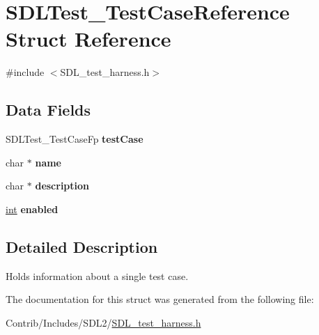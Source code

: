 \hypertarget{struct_s_d_l_test___test_case_reference}{}\section{S\+D\+L\+Test\+\_\+\+Test\+Case\+Reference Struct Reference}
\label{struct_s_d_l_test___test_case_reference}


{\ttfamily \#include $<$S\+D\+L\+\_\+test\+\_\+harness.\+h$>$}

\subsection*{Data Fields}
\begin{DoxyCompactItemize}
\item 
S\+D\+L\+Test\+\_\+\+Test\+Case\+Fp {\bfseries test\+Case}\hypertarget{struct_s_d_l_test___test_case_reference_a0576a913b1af0c2aa389358522ed2290}{}\label{struct_s_d_l_test___test_case_reference_a0576a913b1af0c2aa389358522ed2290}

\item 
char $\ast$ {\bfseries name}\hypertarget{struct_s_d_l_test___test_case_reference_a5ac083a645d964373f022d03df4849c8}{}\label{struct_s_d_l_test___test_case_reference_a5ac083a645d964373f022d03df4849c8}

\item 
char $\ast$ {\bfseries description}\hypertarget{struct_s_d_l_test___test_case_reference_a8444d6e0dfe2bbab0b5e7b24308f1559}{}\label{struct_s_d_l_test___test_case_reference_a8444d6e0dfe2bbab0b5e7b24308f1559}

\item 
\hyperlink{_s_d_l__thread_8h_a6a64f9be4433e4de6e2f2f548cf3c08e}{int} {\bfseries enabled}\hypertarget{struct_s_d_l_test___test_case_reference_a03e6cca0c879c0443efb431c30c14f76}{}\label{struct_s_d_l_test___test_case_reference_a03e6cca0c879c0443efb431c30c14f76}

\end{DoxyCompactItemize}


\subsection{Detailed Description}
Holds information about a single test case. 

The documentation for this struct was generated from the following file\+:\begin{DoxyCompactItemize}
\item 
Contrib/\+Includes/\+S\+D\+L2/\hyperlink{_s_d_l__test__harness_8h}{S\+D\+L\+\_\+test\+\_\+harness.\+h}\end{DoxyCompactItemize}
